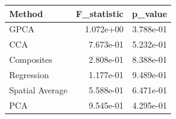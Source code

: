 \begin{tabular}{lrr}
\toprule
Method & F_statistic & p_value \\
\midrule
GPCA & 1.072e+00 & 3.788e-01 \\
CCA & 7.673e-01 & 5.232e-01 \\
Composites & 2.808e-01 & 8.388e-01 \\
Regression & 1.177e-01 & 9.489e-01 \\
Spatial Average & 5.588e-01 & 6.471e-01 \\
PCA & 9.545e-01 & 4.295e-01 \\
\bottomrule
\end{tabular}
